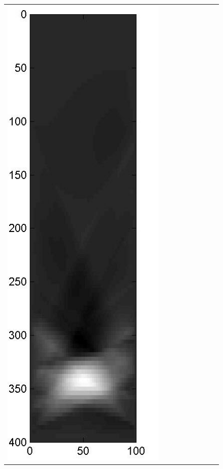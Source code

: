 \documentclass[11pt]{article}
\begin{document}
{\begin{figure}[!h]
\begin{center}
\begin{tabular}{|c|c|c|c|c|c|c|c|c|}
			\includegraphics[width=.9\iwidth]{figures/newFigs/noisy/resultsExp-8-mk}
			&

\end{tabular}
\end{center}
\end{figure}}
\end{document}
